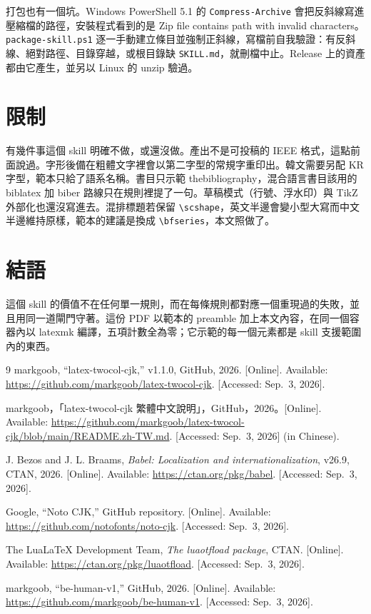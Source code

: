 打包也有一個坑。Windows PowerShell 5.1 的 \texttt{Compress-Archive} 會把反斜線寫進壓縮檔的路徑，安裝程式看到的是 Zip file contains path with invalid characters。\texttt{package-skill.ps1} 逐一手動建立條目並強制正斜線，寫檔前自我驗證：有反斜線、絕對路徑、目錄穿越，或根目錄缺 \texttt{SKILL.md}，就刪檔中止。Release 上的資產都由它產生，並另以 Linux 的 unzip 驗過。

\section{限制}
\label{sec:limits}

有幾件事這個 skill 明確不做，或還沒做。產出不是可投稿的 IEEE 格式，這點前面說過。字形後備在粗體文字裡會以第二字型的常規字重印出。韓文需要另配 KR 字型，範本只給了語系名稱。書目只示範 thebibliography，混合語言書目該用的 biblatex 加 biber 路線只在規則裡提了一句。草稿模式（行號、浮水印）與 TikZ 外部化也還沒寫進去。混排標題若保留 \verb|\scshape|，英文半邊會變小型大寫而中文半邊維持原樣，範本的建議是換成 \verb|\bfseries|，本文照做了。

\section{結語}
\label{sec:end}

這個 skill 的價值不在任何單一規則，而在每條規則都對應一個重現過的失敗，並且用同一道閘門守著。這份 PDF 以範本的 preamble 加上本文內容，在同一個容器內以 latexmk 編譯，五項計數全為零；它示範的每一個元素都是 skill 支援範圍內的東西。

\begingroup
\raggedright
\small
\begin{thebibliography}{9}
markgoob, ``latex-twocol-cjk,'' v1.1.0, GitHub, 2026. [Online]. Available:
\url{https://github.com/markgoob/latex-twocol-cjk}. [Accessed: Sep.~3, 2026].

markgoob，「latex-twocol-cjk 繁體中文說明」，GitHub，2026。[Online]. Available:
\url{https://github.com/markgoob/latex-twocol-cjk/blob/main/README.zh-TW.md}.
[Accessed: Sep.~3, 2026] (in Chinese).

J. Bezos and J. L. Braams, \textit{Babel: Localization and
internationalization}, v26.9, CTAN, 2026. [Online]. Available:
\url{https://ctan.org/pkg/babel}. [Accessed: Sep.~3, 2026].

Google, ``Noto CJK,'' GitHub repository. [Online]. Available:
\url{https://github.com/notofonts/noto-cjk}. [Accessed: Sep.~3, 2026].

The LuaLaTeX Development Team, \textit{The luaotfload package}, CTAN.
[Online]. Available: \url{https://ctan.org/pkg/luaotfload}.
[Accessed: Sep.~3, 2026].

markgoob, ``be-human-v1,'' GitHub, 2026. [Online]. Available:
\url{https://github.com/markgoob/be-human-v1}. [Accessed: Sep.~3, 2026].
\end{thebibliography}
\endgroup


